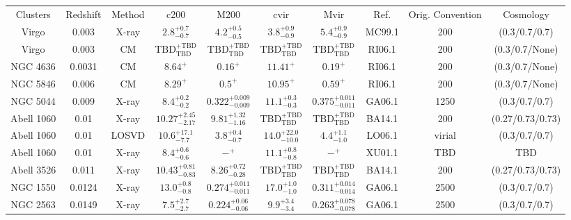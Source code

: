 \begin{table}
\begin{tabular}{cccccccccc}
Clusters & Redshift & Method & c200 & M200 & cvir & Mvir & Ref. & Orig. Convention & Cosmology \\
Virgo & 0.003 & X-ray & ${2.8}^{+0.7}_{-0.7}$ & ${4.2}^{+0.5}_{-0.5}$ & ${3.8}^{+0.9}_{-0.9}$ & ${5.4}^{+0.9}_{-0.9}$ & MC99.1 & 200 & (0.3/0.7/0.7) \\
Virgo & 0.003 & CM & ${\mathrm{TBD}}^{+\mathrm{TBD}}_{\mathrm{TBD}}$ & ${\mathrm{TBD}}^{+\mathrm{TBD}}_{\mathrm{TBD}}$ & ${\mathrm{TBD}}^{+\mathrm{TBD}}_{\mathrm{TBD}}$ & ${\mathrm{TBD}}^{+\mathrm{TBD}}_{\mathrm{TBD}}$ & RI06.1 & 200 & (0.3/0.7/None) \\
NGC 4636 & 0.0031 & CM & ${8.64}^{+}_{}$ & ${0.16}^{+}_{}$ & ${11.41}^{+}_{}$ & ${0.19}^{+}_{}$ & RI06.1 & 200 & (0.3/0.7/None) \\
NGC 5846 & 0.006 & CM & ${8.29}^{+}_{}$ & ${0.5}^{+}_{}$ & ${10.95}^{+}_{}$ & ${0.59}^{+}_{}$ & RI06.1 & 200 & (0.3/0.7/None) \\
NGC 5044 & 0.009 & X-ray & ${8.4}^{+0.2}_{-0.2}$ & ${0.322}^{+0.009}_{-0.009}$ & ${11.1}^{+0.3}_{-0.3}$ & ${0.375}^{+0.011}_{-0.011}$ & GA06.1 & 1250 & (0.3/0.7/0.7) \\
Abell 1060 & 0.01 & X-ray & ${10.27}^{+2.45}_{-2.17}$ & ${9.81}^{+1.32}_{-1.16}$ & ${\mathrm{TBD}}^{+\mathrm{TBD}}_{\mathrm{TBD}}$ & ${\mathrm{TBD}}^{+\mathrm{TBD}}_{\mathrm{TBD}}$ & BA14.1 & 200 & (0.27/0.73/0.73) \\
Abell 1060 & 0.01 & LOSVD & ${10.6}^{+17.1}_{-7.7}$ & ${3.8}^{+0.4}_{-0.7}$ & ${14.0}^{+22.0}_{-10.0}$ & ${4.4}^{+1.1}_{-1.0}$ & LO06.1 & virial & (0.3/0.7/0.7) \\
Abell 1060 & 0.01 & X-ray & ${8.4}^{+0.6}_{-0.6}$ & ${-}^{+}_{}$ & ${11.1}^{+0.8}_{-0.8}$ & ${-}^{+}_{}$ & XU01.1 & TBD & TBD \\
Abell 3526 & 0.011 & X-ray & ${10.43}^{+0.81}_{-0.83}$ & ${8.26}^{+0.72}_{-0.28}$ & ${\mathrm{TBD}}^{+\mathrm{TBD}}_{\mathrm{TBD}}$ & ${\mathrm{TBD}}^{+\mathrm{TBD}}_{\mathrm{TBD}}$ & BA14.1 & 200 & (0.27/0.73/0.73) \\
NGC 1550 & 0.0124 & X-ray & ${13.0}^{+0.8}_{-0.8}$ & ${0.274}^{+0.011}_{-0.011}$ & ${17.0}^{+1.0}_{-1.0}$ & ${0.311}^{+0.014}_{-0.014}$ & GA06.1 & 2500 & (0.3/0.7/0.7) \\
NGC 2563 & 0.0149 & X-ray & ${7.5}^{+2.7}_{-2.7}$ & ${0.224}^{+0.06}_{-0.06}$ & ${9.9}^{+3.4}_{-3.4}$ & ${0.263}^{+0.078}_{-0.078}$ & GA06.1 & 2500 & (0.3/0.7/0.7) \\

\end{tabular}
\end{table}
